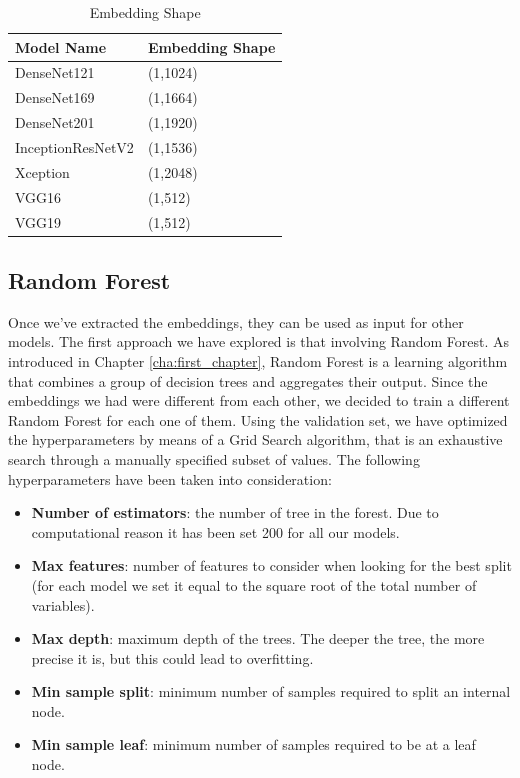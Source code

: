 \begin{table}[h!]
\centering
\begin{tabular}{|l|l|} 
\hline
\textbf{Model Name}         &   \hfill \textbf{Embedding Shape}\\
\hline
DenseNet121 &   \hfil (1,1024) \\\hline
DenseNet169 &  \hfil (1,1664)   \\\hline
DenseNet201 &  \hfil (1,1920) \\\hline
InceptionResNetV2 &  \hfil (1,1536) \\\hline
Xception &  \hfil (1,2048) \\\hline
VGG16 &  \hfil (1,512) \\\hline
VGG19 &  \hfil (1,512) \\\hline

\end{tabular}
\caption{Embedding Shape}
\label{table:table_4.2}
\end{table}

\subsection{Random Forest}
\label{sec:random_forest_model}
Once we've extracted the embeddings, they can be used as input for other models. The first approach we have explored is that involving Random Forest. As introduced in Chapter \ref{cha:first_chapter}, Random Forest is a learning algorithm that combines a group of decision trees and aggregates their output. 
Since the embeddings we had were different from each other, we decided to train a different Random Forest for each one of them. Using the validation set, we have optimized the hyperparameters by means of a Grid Search algorithm, that is an exhaustive search through a manually specified subset of values. The following hyperparameters have been taken into consideration: 
\begin{itemize}
    \item \textbf{Number of estimators}: the number of tree in the forest. Due to computational reason it has been set 200 for all our models.
    \item \textbf{Max features}: number of features to consider when looking for the best split (for each model we set it equal to the square root of the total number of variables).
    \item \textbf{Max depth}: maximum depth of the trees. The deeper the tree, the more precise it is, but this could lead to overfitting.
    \item \textbf{Min sample split}: minimum number of samples required to split an internal node.
    \item \textbf{Min sample leaf}: minimum number of samples required to be at a leaf node.
\end{itemize}


